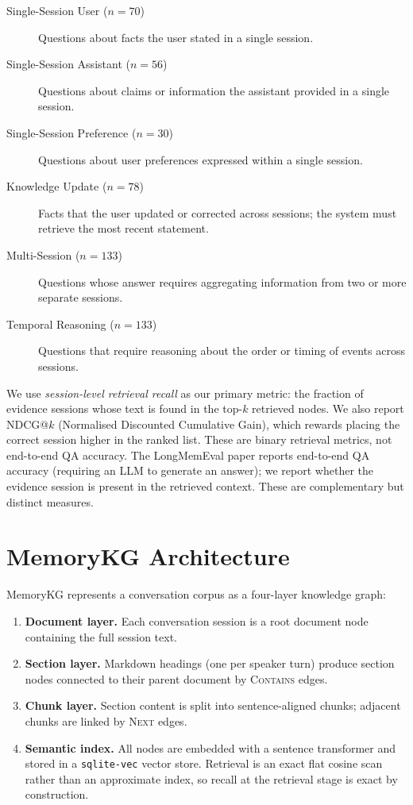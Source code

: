\documentclass[11pt,a4paper]{article}
\begin{document}
\begin{description}
  \item[Single-Session User ($n{=}70$)] Questions about facts the user stated in a
        single session.
  \item[Single-Session Assistant ($n{=}56$)] Questions about claims or information
        the assistant provided in a single session.
  \item[Single-Session Preference ($n{=}30$)] Questions about user preferences expressed
        within a single session.
  \item[Knowledge Update ($n{=}78$)] Facts that the user updated or corrected across
        sessions; the system must retrieve the most recent statement.
  \item[Multi-Session ($n{=}133$)] Questions whose answer requires aggregating
        information from two or more separate sessions.
  \item[Temporal Reasoning ($n{=}133$)] Questions that require reasoning about the
        order or timing of events across sessions.
\end{description}

We use \emph{session-level retrieval recall} as our primary metric: the fraction
of evidence sessions whose text is found in the top-$k$ retrieved nodes.
We also report NDCG@$k$ (Normalised Discounted Cumulative Gain), which rewards
placing the correct session higher in the ranked list.
These are binary retrieval metrics, not end-to-end QA accuracy.
The LongMemEval paper reports end-to-end QA accuracy (requiring an LLM to generate
an answer); we report whether the evidence session is present in the retrieved context.
These are complementary but distinct measures.

\section{MemoryKG Architecture}
\label{sec:arch}

MemoryKG represents a conversation corpus as a four-layer knowledge graph:

\begin{enumerate}
  \item \textbf{Document layer.} Each conversation session is a root document node
        containing the full session text.
  \item \textbf{Section layer.} Markdown headings (one per speaker turn) produce
        section nodes connected to their parent document by \textsc{Contains} edges.
  \item \textbf{Chunk layer.} Section content is split into sentence-aligned chunks;
        adjacent chunks are linked by \textsc{Next} edges.
  \item \textbf{Semantic index.} All nodes are embedded with a sentence transformer
        and stored in a \texttt{sqlite-vec} vector store. Retrieval is an exact flat
        cosine scan rather than an approximate index, so recall at the retrieval
        stage is exact by construction.
\end{enumerate}
\end{document}
